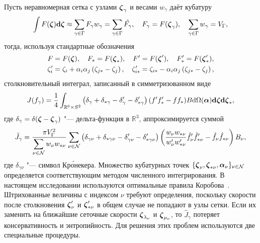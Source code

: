 Пусть неравномерная сетка с узлами \({\boldsymbol{\zeta}}_\gamma\) и весами \(w_\gamma\) даёт кубатуру
\begin{equation*}
    \int F({\boldsymbol{\zeta}}) \boldsymbol{\mathrm{d}\zeta} \approx \sum_{\gamma\in\Gamma} F_\gamma w_\gamma =
        \sum_{\gamma\in\Gamma} \hat{F_\gamma},
    \quad F_\gamma = F({\boldsymbol{\zeta}}_\gamma),
    \quad \sum_{\gamma\in\Gamma} w_\gamma = V_\Gamma,
\end{equation*}
тогда, используя стандартные обозначения
\begin{gather*}
    F=F({\boldsymbol{\zeta}}), \quad F_*=F({\boldsymbol{\zeta}}_*), \quad F'=F({\boldsymbol{\zeta}}'), \quad F'_*=F({\boldsymbol{\zeta}}'_*), \\
    \zeta_i' = \zeta_i+\alpha_i\alpha_j \left(\zeta_{j*}-\zeta_j\right), \quad
    \zeta_{i*}' = \zeta_{i*}-\alpha_i\alpha_j \left(\zeta_{j*}-\zeta_j\right),
\end{gather*}
столкновительный интеграл, записанный в симметризованном виде
\begin{equation*}
    J(f_\gamma) = \frac14\int_{\mathbb{R}^6\times S^2} \left(
        \delta_\gamma + \delta_{*\gamma} - \delta'_\gamma - \delta'_{*\gamma}
    \right) (f'f'_* - ff_*)B \mathrm{d}\Omega(\boldsymbol{\alpha}) \boldsymbol{\mathrm{d}\zeta}\boldsymbol{\mathrm{d}\zeta}_*,
\end{equation*}
где \(\delta_\gamma = \delta({\boldsymbol{\zeta}}-{\boldsymbol{\zeta}}_\gamma)\) "--- дельта-функция в \(\mathbb{R}^3\),
аппроксимируется суммой
\begin{equation*}
    \hat{J}_\gamma = \frac{\pi V_\Gamma^2}{\displaystyle\sum_{\nu\in\mathcal{N}} w_{\nu}w_{*\nu}}
        \sum_{\nu\in\mathcal{N}} \left(
            \delta_{\gamma\nu} + \delta_{*\gamma\nu} - \delta'_{\gamma\nu} - \delta'_{*\gamma\nu}
        \right)\left(
            \frac{w_{\nu}w_{*\nu}}{w'_{\nu}w'_{*\nu}}
            \hat{f}'_{\nu}\hat{f}'_{*\nu} - \hat{f}_{\nu}\hat{f}_{*\nu}
        \right)B_\nu,
\end{equation*}
где \(\delta_{\gamma\nu}\) "--- символ Кр\'{о}некера.
Множество кубатурных точек \(\{{\boldsymbol{\zeta}}_\nu, {\boldsymbol{\zeta}}_{*\nu}, \boldsymbol{\alpha}_\nu\}_{\nu\in\mathcal{N}}\) определяется
соответствующим методом численного интегрирования.
В настоящем исследовании используются оптимальные правила Коробова~\autocite{Korobov1963}.
Штрихованные величины с индексом \(\nu\) требуют определения,
поскольку скорости после столкновения \({\boldsymbol{\zeta}}'_\nu\) и \({\boldsymbol{\zeta}}'_{*\nu}\) в общем случае не попадают в узлы сетки.
Если их заменить на ближайшие сеточные скорости \({\boldsymbol{\zeta}}_{\lambda_\nu}\) и \({\boldsymbol{\zeta}}_{\mu_\nu}\),
то \(\hat{J}_\gamma\) потеряет консервативность и энтропийность.
Для решения этих проблем используются две специальные процедуры.

